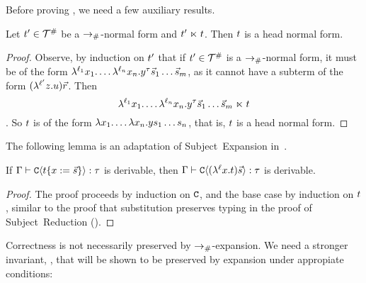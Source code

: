 Before proving , we need a few auxiliary results.

\begin{lemma}
Let $t' \in \mathcal{T}^{\mathtt{\#}}$ be a $\mathrel{\to_{\mathtt{\#}}}$-normal form
and $t' \mathrel{\ltimes} t$. Then $t$ is a head normal form.
\end{lemma}
\begin{proof}
Observe, by induction on $t'$
that if $t' \in \mathcal{T}^{\mathtt{\#}}$ is a $\mathrel{\to_{\mathtt{\#}}}$-normal form, it must be
of the form
$
  \lambda^{\ell_1} x_1. \hdots\lambda^{\ell_n} x_n. y^\tau \vec{s}_1 \hdots \vec{s}_m
$,
as it cannot have a subterm of the form $(\lambda^{\ell'} z. u)\vec{r}$.
Then \[\lambda^{\ell_1} x_1. \hdots\lambda^{\ell_n} x_n. y^\tau \vec{s}_1 \hdots \vec{s}_m \mathrel{\ltimes} t\].
So $t$ is of the form $\lambda x_1. \hdots\lambda x_n. y s_1 \hdots s_n$,
that is, $t$ is a head normal form.
\end{proof}

The following lemma is an adaptation of Subject~Expansion in~\cite{bucciarelli2017non}.
\begin{lemma}
If $\Gamma \vdash \mathtt{C}\langle t\{x := \vec{s}\}\rangle : \tau$ is derivable,
then $\Gamma \vdash \mathtt{C}\langle(\lambda^{\ell} x. t)\vec{s}\rangle : \tau$ is derivable.
\end{lemma}
\begin{proof}
The proof proceeds by induction on $\mathtt{C}$,
and the base case by induction on $t$, 
similar to the proof that substitution preserves typing in
the proof of Subject~Reduction ().
\end{proof}

Correctness is not necessarily preserved by $\mathrel{\to_{\mathtt{\#}}}$-expansion.
We need a stronger invariant, ,
that will be shown to be preserved by expansion
under appropiate conditions:

